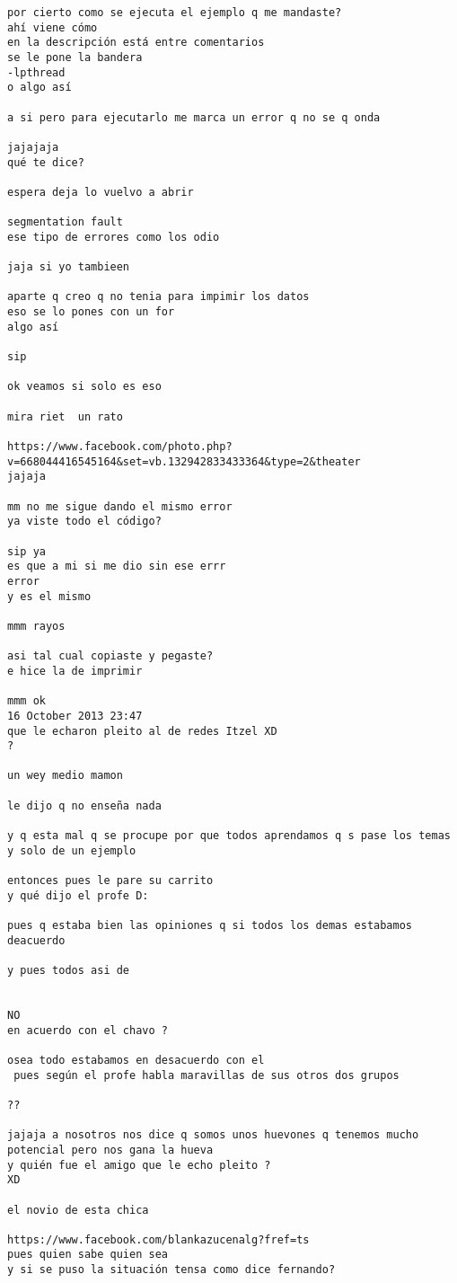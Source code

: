 \begin{verbatim}
por cierto como se ejecuta el ejemplo q me mandaste?
ahí viene cómo
en la descripción está entre comentarios
se le pone la bandera
-lpthread
o algo así

a si pero para ejecutarlo me marca un error q no se q onda

jajajaja
qué te dice?

espera deja lo vuelvo a abrir

segmentation fault
ese tipo de errores como los odio

jaja si yo tambieen

aparte q creo q no tenia para impimir los datos
eso se lo pones con un for
algo así

sip

ok veamos si solo es eso

mira riet  un rato

https://www.facebook.com/photo.php?v=668044416545164&set=vb.132942833433364&type=2&theater
jajaja

mm no me sigue dando el mismo error
ya viste todo el código?

sip ya
es que a mi si me dio sin ese errr
error
y es el mismo

mmm rayos

asi tal cual copiaste y pegaste?
e hice la de imprimir

mmm ok
16 October 2013 23:47
que le echaron pleito al de redes Itzel XD
?

un wey medio mamon

le dijo q no enseña nada

y q esta mal q se procupe por que todos aprendamos q s pase los temas y solo de un ejemplo

entonces pues le pare su carrito
y qué dijo el profe D:

pues q estaba bien las opiniones q si todos los demas estabamos deacuerdo

y pues todos asi de


NO
en acuerdo con el chavo ?

osea todo estabamos en desacuerdo con el
 pues según el profe habla maravillas de sus otros dos grupos

??

jajaja a nosotros nos dice q somos unos huevones q tenemos mucho potencial pero nos gana la hueva
y quién fue el amigo que le echo pleito ?
XD

el novio de esta chica

https://www.facebook.com/blankazucenalg?fref=ts
pues quien sabe quien sea
y si se puso la situación tensa como dice fernando?


\end{verbatim}

